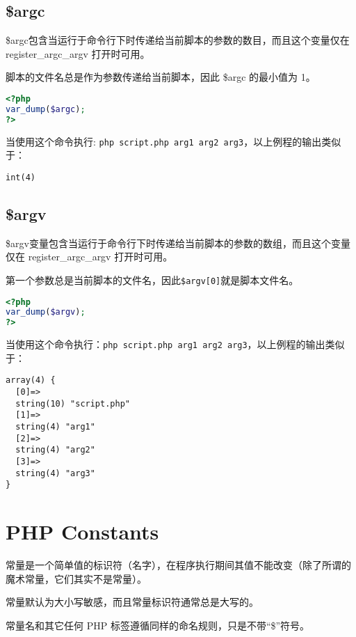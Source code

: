 \section{\$argc}


\$argc包含当运行于命令行下时传递给当前脚本的参数的数目，而且这个变量仅在 register\_argc\_argv 打开时可用。

脚本的文件名总是作为参数传递给当前脚本，因此 \$argc 的最小值为 1。




\begin{lstlisting}[language=PHP]
<?php
var_dump($argc);
?>
\end{lstlisting}


当使用这个命令执行: \verb|php script.php arg1 arg2 arg3|，以上例程的输出类似于：

\begin{verbatim}
int(4)
\end{verbatim}


\section{\$argv}

\$argv变量包含当运行于命令行下时传递给当前脚本的参数的数组，而且这个变量仅在 register\_argc\_argv 打开时可用。

第一个参数总是当前脚本的文件名，因此\texttt{\$argv[0]}就是脚本文件名。



\begin{lstlisting}[language=PHP]
<?php
var_dump($argv);
?>
\end{lstlisting}


当使用这个命令执行：\verb|php script.php arg1 arg2 arg3|，以上例程的输出类似于：

\begin{verbatim}
array(4) {
  [0]=>
  string(10) "script.php"
  [1]=>
  string(4) "arg1"
  [2]=>
  string(4) "arg2"
  [3]=>
  string(4) "arg3"
}
\end{verbatim}


\chapter{PHP Constants}

常量是一个简单值的标识符（名字），在程序执行期间其值不能改变（除了所谓的魔术常量，它们其实不是常量）。

\begin{compactitem}
\item 常量默认为大小写敏感，而且常量标识符通常总是大写的。
\item 常量名和其它任何 PHP 标签遵循同样的命名规则，只是不带“\$”符号。
\end{compactitem}

